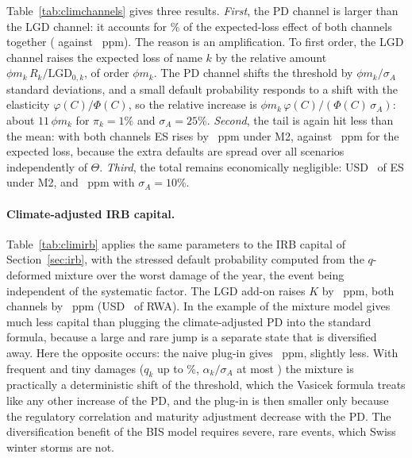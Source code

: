 \begin{table}[tb]
\caption{Physical risk through the LGD and the PD channel (reference run, $N=2{,}000{,}000$, storms independent of $\Theta$, $\phi_k=0.5$). $\Delta$EL is exact; $\Delta$ES is the first-order effect, with the defaults added by the PD channel replaced by their expectation given $\Theta$. Lower block: every gust speed of the catalogue raised by the stated percentage, both channels, $\sigma_A=25\%$.}
\label{tab:climchannels}
\centering
{}
\end{table}

Table~\ref{tab:climchannels} gives three results. \emph{First}, the PD channel is larger than the LGD channel: it accounts for \% of the expected-loss effect of both channels together ( against ~ppm). The reason is an amplification. To first order, the LGD channel raises the expected loss of name $k$ by the relative amount $\phi m_k\,R_k/\mathrm{LGD}_{0,k}$, of order $\phi m_k$. The PD channel shifts the threshold by $\phi m_k/\sigma_A$ standard deviations, and a small default probability responds to a shift with the elasticity $\varphi(C)/\Phi(C)$, so the relative increase is $\phi m_k\,\varphi(C)/(\Phi(C)\,\sigma_A)$: about $11\,\phi m_k$ for $\pi_k=1\%$ and $\sigma_A=25\%$. \emph{Second}, the tail is again hit less than the mean: with both channels ES rises by ~ppm under M2, against ~ppm for the expected loss, because the extra defaults are spread over all scenarios independently of $\Theta$. \emph{Third}, the total remains economically negligible: USD~ of ES under M2, and ~ppm with $\sigma_A=10\%$.

\paragraph{Climate-adjusted IRB capital.}
Table~\ref{tab:climirb} applies the same parameters to the IRB capital of Section~\ref{sec:irb}, with the stressed default probability computed from the $q$-deformed mixture over the worst damage of the year, the event being independent of the systematic factor. The LGD add-on raises $K$ by ~ppm, both channels by ~ppm (USD~ of RWA). In the example of \citet{Pozdyshev25} the mixture model gives much less capital than plugging the climate-adjusted PD into the standard formula, because a large and rare jump is a separate state that is diversified away. Here the opposite occurs: the naive plug-in gives ~ppm, slightly less. With frequent and tiny damages ($q_k$ up to \%, $\alpha_k/\sigma_A$ at most ) the mixture is practically a deterministic shift of the threshold, which the Vasicek formula treats like any other increase of the PD, and the plug-in is then smaller only because the regulatory correlation and maturity adjustment decrease with the PD. The diversification benefit of the BIS model requires severe, rare events, which Swiss winter storms are not.

